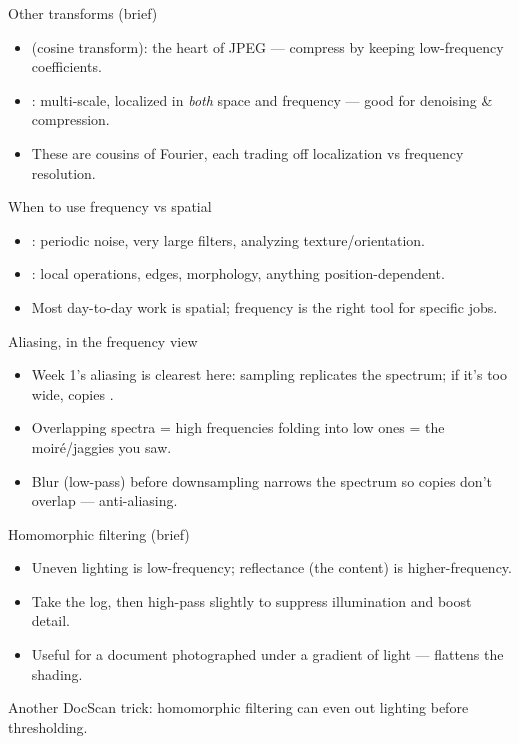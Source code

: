\documentclass[10pt,aspectratio=169]{beamer}
\begin{document}
\begin{frame}{Other transforms (brief)}
  \begin{itemize}
    \item {} (cosine transform): the heart of JPEG — compress by keeping low-frequency coefficients.
    \item {}: multi-scale, localized in \emph{both} space and frequency — good for denoising \& compression.
    \item These are cousins of Fourier, each trading off localization vs frequency resolution.
  \end{itemize}
\end{frame}

\begin{frame}{When to use frequency vs spatial}
  \begin{itemize}
    \item {}: periodic noise, very large filters, analyzing texture/orientation.
    \item {}: local operations, edges, morphology, anything position-dependent.
    \item Most day-to-day work is spatial; frequency is the right tool for specific jobs.
  \end{itemize}
\end{frame}

\begin{frame}{Aliasing, in the frequency view}
  \begin{itemize}
    \item Week 1's aliasing is clearest here: sampling replicates the spectrum; if it's too wide, copies .
    \item Overlapping spectra = high frequencies folding into low ones = the moir\'e/jaggies you saw.
    \item Blur (low-pass) before downsampling narrows the spectrum so copies don't overlap — anti-aliasing.
  \end{itemize}
\end{frame}

\begin{frame}{Homomorphic filtering (brief)}
  \begin{itemize}
    \item Uneven lighting is low-frequency; reflectance (the content) is higher-frequency.
    \item Take the log, then high-pass slightly to suppress illumination and boost detail.
    \item Useful for a document photographed under a gradient of light — flattens the shading.
  \end{itemize}
  \begin{goodbox}
    Another DocScan trick: homomorphic filtering can even out lighting before thresholding.
  \end{goodbox}
\end{frame}
\end{document}
